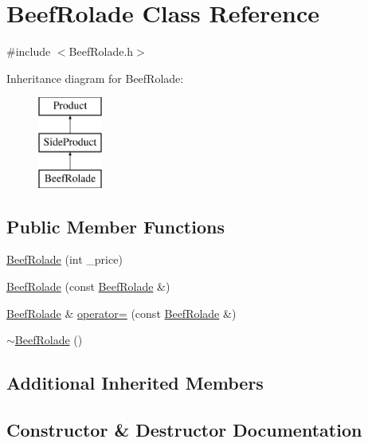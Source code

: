 \hypertarget{classBeefRolade}{}\section{Beef\+Rolade Class Reference}
\label{classBeefRolade}


{\ttfamily \#include $<$Beef\+Rolade.\+h$>$}

Inheritance diagram for Beef\+Rolade\+:\begin{figure}[H]
\begin{center}
\leavevmode
\includegraphics[height=3.000000cm]{classBeefRolade}
\end{center}
\end{figure}
\subsection*{Public Member Functions}
\begin{DoxyCompactItemize}
\item 
\mbox{\hyperlink{classBeefRolade_a482ab8abe02400dd58f73905f1c3b8a9}{Beef\+Rolade}} (int \+\_\+price)
\item 
\mbox{\hyperlink{classBeefRolade_aa146791a1024384ebb59a8f843e4bcdd}{Beef\+Rolade}} (const \mbox{\hyperlink{classBeefRolade}{Beef\+Rolade}} \&)
\item 
\mbox{\hyperlink{classBeefRolade}{Beef\+Rolade}} \& \mbox{\hyperlink{classBeefRolade_a8325fd949e7c620eedf4d26451b47fa9}{operator=}} (const \mbox{\hyperlink{classBeefRolade}{Beef\+Rolade}} \&)
\item 
\mbox{\hyperlink{classBeefRolade_a9c867e5e6d2f50348955ff59b1f58adc}{$\sim$\+Beef\+Rolade}} ()
\end{DoxyCompactItemize}
\subsection*{Additional Inherited Members}


\subsection{Constructor \& Destructor Documentation}
\mbox{\label{classBeefRolade_a482ab8abe02400dd58f73905f1c3b8a9}} 
